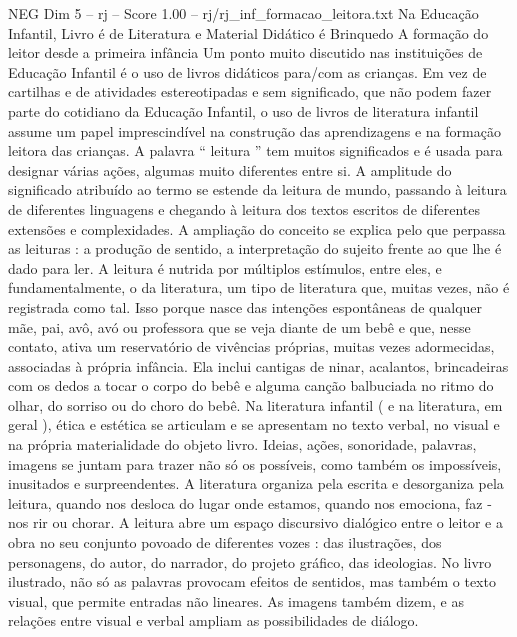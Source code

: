 \begin{textsample}{NEG Dim 5 – rj – Score 1.00 – rj/rj\_inf\_formacao\_leitora.txt}  \label{ex:f5_neg_095}
Na Educação Infantil, Livro é de Literatura e Material Didático é Brinquedo A formação do leitor desde a primeira infância Um ponto muito discutido nas instituições de Educação Infantil é o uso de livros didáticos para/com as crianças.
Em vez de cartilhas e de atividades estereotipadas e sem significado, que não podem fazer parte do cotidiano da Educação Infantil, o uso de livros de literatura infantil assume um papel imprescindível na construção das aprendizagens e na formação leitora das crianças.
A palavra “ leitura ” tem muitos significados e é usada para designar várias ações, algumas muito diferentes entre si.
A amplitude do significado atribuído ao termo se estende da leitura de mundo, passando à leitura de diferentes linguagens e chegando à leitura dos textos escritos de diferentes extensões e complexidades.
A ampliação do conceito se explica pelo que perpassa as leituras : a produção de sentido, a interpretação do sujeito frente ao que lhe é dado para ler.
A leitura é nutrida por múltiplos estímulos, entre eles, e fundamentalmente, o da literatura, um tipo de literatura que, muitas vezes, não é registrada como tal.
Isso porque nasce das intenções espontâneas de qualquer mãe, pai, avô, avó ou professora que se veja diante de um bebê e que, nesse contato, ativa um reservatório de vivências próprias, muitas vezes adormecidas, associadas à própria infância.
Ela inclui cantigas de ninar, acalantos, brincadeiras com os dedos a tocar o corpo do bebê e alguma canção balbuciada no ritmo do olhar, do sorriso ou do choro do bebê.
Na literatura infantil ( e na literatura, em geral ), ética e estética se articulam e se apresentam no texto verbal, no visual e na própria materialidade do objeto livro.
Ideias, ações, sonoridade, palavras, imagens se juntam para trazer não só os possíveis, como também os impossíveis, inusitados e surpreendentes.
A literatura organiza pela escrita e desorganiza pela leitura, quando nos desloca do lugar onde estamos, quando nos emociona, faz -nos rir ou chorar.
A leitura abre um espaço discursivo dialógico entre o leitor e a obra no seu conjunto povoado de diferentes vozes : das ilustrações, dos personagens, do autor, do narrador, do projeto gráfico, das ideologias.
No livro ilustrado, não só as palavras provocam efeitos de sentidos, mas também o texto visual, que permite entradas não lineares.
As imagens também dizem, e as relações entre visual e verbal ampliam as possibilidades de diálogo.

\end{textsample}
